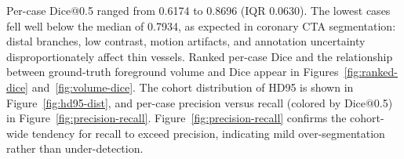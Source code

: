 \documentclass[anonymous]{iopjournal}
\begin{document}
Per-case Dice@0.5 ranged from 0.6174 to 0.8696 (IQR 0.0630). The lowest cases fell well below the median of 0.7934, as expected in coronary CTA segmentation: distal branches, low contrast, motion artifacts, and annotation uncertainty disproportionately affect thin vessels. Ranked per-case Dice and the relationship between ground-truth foreground volume and Dice appear in Figures~\ref{fig:ranked-dice} and~\ref{fig:volume-dice}. The cohort distribution of HD95 is shown in Figure~\ref{fig:hd95-dist}, and per-case precision versus recall (colored by Dice@0.5) in Figure~\ref{fig:precision-recall}. Figure~\ref{fig:precision-recall} confirms the cohort-wide tendency for recall to exceed precision, indicating mild over-segmentation rather than under-detection.

\end{document}
